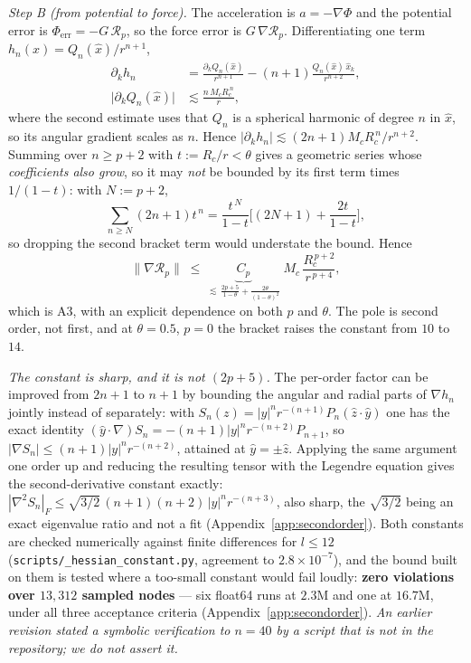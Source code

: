 \emph{Step B (from potential to force).} The acceleration is $a=-\nabla\Phi$ and the potential
error is $\Phi_{\mathrm{err}}=-G\,\mathcal R_p$, so the force error is $G\,\nabla\mathcal R_p$.
Differentiating one term $h_n(x)=Q_n(\hat x)/r^{n+1}$,
\begin{equation}
\begin{aligned}
\partial_k h_n&=\frac{\partial_k Q_n(\hat x)}{r^{n+1}}
  -(n+1)\frac{Q_n(\hat x)\,\hat x_k}{r^{n+2}},\\
\big|\partial_k Q_n(\hat x)\big|&\lesssim \frac{n\,M_c R_c^{\,n}}{r},
\end{aligned}
\end{equation}
where the second estimate uses that $Q_n$ is a spherical harmonic of degree $n$ in $\hat x$, so
its angular gradient scales as $n$. Hence
$|\partial_k h_n|\lesssim (2n+1)M_c R_c^{\,n}/r^{n+2}$. Summing over $n\ge p+2$ with
$t:=R_c/r<\theta$ gives a geometric series whose \emph{coefficients also grow}, so it may
\emph{not} be bounded by its first term times $1/(1-t)$: with $N:=p+2$,
\begin{equation}
\sum_{n\ge N}(2n+1)t^{\,n}
=\frac{t^{\,N}}{1-t}\Big[(2N+1)+\frac{2t}{1-t}\Big],
\end{equation}
so dropping the second bracket term would understate the bound. Hence
\begin{equation}
\big\|\nabla\mathcal R_p\big\|\;\le\;
\underbrace{C_p}_{\textstyle \lesssim\,\frac{2p+5}{1-\theta}+\frac{2\theta}{(1-\theta)^2}}\;
M_c\,\frac{R_c^{\,p+2}}{r^{\,p+4}},
\end{equation}
which is A3, with an explicit dependence on both $p$ and $\theta$. The pole is second order,
not first, and at $\theta=0.5$, $p=0$ the bracket raises the constant from $10$ to $14$.

\emph{The constant is sharp, and it is not $(2p+5)$.} The per-order factor can be improved from
$2n+1$ to $n+1$ by bounding the angular and radial parts of $\nabla h_n$ jointly instead of
separately: with $S_n(z)=|y|^n r^{-(n+1)}P_n(\hat z\cdot\hat y)$ one has the exact identity
$(\hat y\cdot\nabla)S_n=-(n+1)|y|^n r^{-(n+2)}P_{n+1}$, so $|\nabla S_n|\le(n+1)|y|^n r^{-(n+2)}$,
attained at $\hat y=\pm\hat z$. Applying the same argument one order up and reducing the resulting
tensor with the Legendre equation gives the second-derivative constant exactly:
$|\nabla^2S_n|_F\le\sqrt{3/2}\,(n+1)(n+2)\,|y|^n r^{-(n+3)}$, also sharp, the $\sqrt{3/2}$
being an exact eigenvalue ratio and not a fit (Appendix~\ref{app:secondorder}). Both constants are checked numerically against finite differences for $l\le12$ (\texttt{scripts/\allowbreak \_\allowbreak hessian\_\allowbreak constant.\allowbreak py}, agreement to $2.8\times10^{-7}$), and the bound built on them is tested where a too-small constant would fail loudly: \textbf{zero violations over $13{,}312$ sampled nodes} --- six float64 runs at $2.3$M and one at $16.7$M, under all three acceptance criteria (Appendix~\ref{app:secondorder}). \emph{An earlier revision stated a symbolic verification to $n=40$ by a script that is not in the repository; we do not assert it.}

